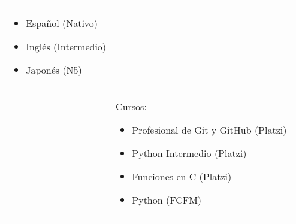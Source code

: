 \documentclass[twoside,letter,openright,10pt]{report}
\begin{document}
\begin{table}[hbt!]
\begin{tabular}{p{40mm}p{140mm}}
\begin{itemize}[noitemsep,nolistsep]
\item Español (Nativo)
\item Inglés (Intermedio)
\item Japonés (N5)
\vspace{-4mm}
\end{itemize}
\\
& Cursos:
\begin{itemize}[noitemsep,nolistsep]
\item Profesional de Git y GitHub (Platzi)
\item Python Intermedio (Platzi)
\item Funciones en C (Platzi)
\item Python (FCFM)
\vspace{-4mm}
\end{itemize}
\end{tabular}
\end{table}
\end{document}

